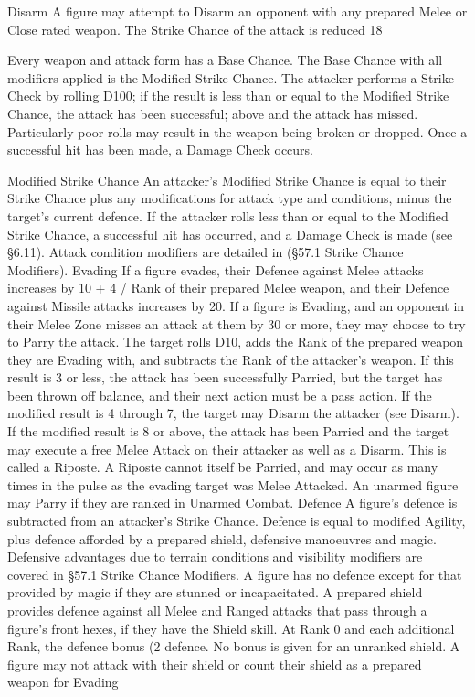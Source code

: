 \documentclass[a4paper]{article}
\begin{document}
\begin{multicols}{3}
Disarm A figure may attempt to Disarm an opponent with any prepared Melee or Close rated
weapon. The Strike Chance of the attack is reduced
18

Every weapon and attack form has a Base Chance.
The Base Chance with all modifiers applied is the
Modified Strike Chance. The attacker performs a
Strike Check by rolling D100; if the result is less
than or equal to the Modified Strike Chance, the
attack has been successful; above and the attack
has missed. Particularly poor rolls may result in the
weapon being broken or dropped. Once a successful hit has been made, a Damage Check occurs.

Modified Strike Chance
An attacker’s Modified Strike Chance is equal to
their Strike Chance plus any modifications for
attack type and conditions, minus the target’s current defence. If the attacker rolls less than or equal
to the Modified Strike Chance, a successful hit has
occurred, and a Damage Check is made (see
§6.11).
Attack condition modifiers are detailed in (§57.1
Strike Chance Modifiers).
Evading
If a figure evades, their Defence against Melee
attacks increases by 10 + 4 / Rank of their prepared
Melee weapon, and their Defence against Missile
attacks increases by 20.
If a figure is Evading, and an opponent in their
Melee Zone misses an attack at them by 30 or
more, they may choose to try to Parry the attack.
The target rolls D10, adds the Rank of the prepared
weapon they are Evading with, and subtracts the
Rank of the attacker’s weapon. If this result is 3 or
less, the attack has been successfully Parried, but
the target has been thrown off balance, and their
next action must be a pass action. If the modified
result is 4 through 7, the target may Disarm the
attacker (see Disarm). If the modified result is 8 or
above, the attack has been Parried and the target
may execute a free Melee Attack on their attacker
as well as a Disarm. This is called a Riposte.
A Riposte cannot itself be Parried, and may occur
as many times in the pulse as the evading target
was Melee Attacked. An unarmed figure may Parry
if they are ranked in Unarmed Combat.
Defence
A figure’s defence is subtracted from an attacker’s
Strike Chance. Defence is equal to modified Agility, plus defence afforded by a prepared shield,
defensive manoeuvres and magic.
Defensive advantages due to terrain conditions and
visibility modifiers are covered in §57.1 Strike
Chance Modifiers. A figure has no defence except
for that provided by magic if they are stunned or
incapacitated.
A prepared shield provides defence against all
Melee and Ranged attacks that pass through a
figure’s front hexes, if they have the Shield skill.
At Rank 0 and each additional Rank, the defence
bonus (2%
defence. No bonus is given for an unranked shield.
A figure may not attack with their shield or count
their shield as a prepared weapon for Evading


\end{multicols}
\end{document}

